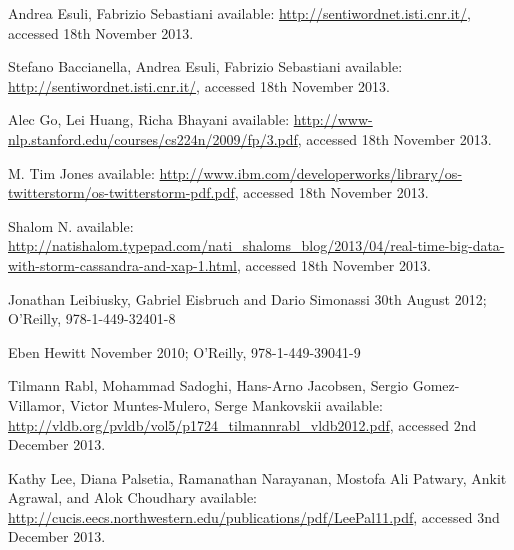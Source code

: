 \documentclass[a4paper]{article}
\begin{document}
\begin{thebibliography}{20}

	Andrea Esuli, Fabrizio Sebastiani
	\newblock available: \url{http://sentiwordnet.isti.cnr.it/}, accessed 18th November 2013.
	
	Stefano Baccianella, Andrea Esuli, Fabrizio Sebastiani
	\newblock available: \url{http://sentiwordnet.isti.cnr.it/}, accessed 18th November 2013.
	
	Alec Go, Lei Huang, Richa Bhayani
	\newblock available: \url{http://www-nlp.stanford.edu/courses/cs224n/2009/fp/3.pdf}, accessed 18th November 2013.
	
	M. Tim Jones
	\newblock available: \url{http://www.ibm.com/developerworks/library/os-twitterstorm/os-twitterstorm-pdf.pdf}, accessed 18th November 2013.
	
	Shalom N. 
	\newblock available: \url{http://natishalom.typepad.com/nati_shaloms_blog/2013/04/real-time-big-data-with-storm-cassandra-and-xap-1.html}, accessed 18th November 2013.

	Jonathan Leibiusky, Gabriel Eisbruch and Dario Simonassi 
	\newblock 30th August 2012; O'Reilly, 978-1-449-32401-8

	Eben Hewitt 
	\newblock November 2010; O'Reilly, 978-1-449-39041-9

	Tilmann Rabl, Mohammad Sadoghi, Hans-Arno Jacobsen, Sergio Gomez-Villamor, Victor Muntes-Mulero, Serge Mankovskii
	\newblock available: \url{http://vldb.org/pvldb/vol5/p1724_tilmannrabl_vldb2012.pdf}, accessed 2nd December 2013.

	Kathy Lee, Diana Palsetia, Ramanathan Narayanan, Mostofa Ali Patwary, Ankit Agrawal, and Alok Choudhary
	\newblock available: \url{http://cucis.eecs.northwestern.edu/publications/pdf/LeePal11.pdf}, accessed 3nd December 2013.


\end{thebibliography}
\end{document}
